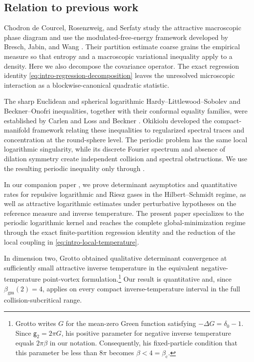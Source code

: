 \documentclass[11pt,reqno]{amsart}
\numberwithin{equation}{section}
\theoremstyle{plain}
\theoremstyle{definition}
\newcommand{\be}{\beta}
\newcommand{\g}{\mathsf g}
\newcommand{\gm}{\mathrm{gm}}
\newcommand{\coll}{\mathrm{c}}
\begin{document}
\subsection{Relation to previous work}
\label{subsec:related-work}

Chodron de Courcel, Rosenzweig, and Serfaty \cite{ChodrondeCourcelRosenzweigSerfaty2025} study the attractive macroscopic phase diagram and use the modulated-free-energy framework developed by Bresch, Jabin, and Wang \cite{BreschJabinWang2023}. Their partition estimate coarse grains the empirical measure so that entropy and a macroscopic variational inequality apply to a density. Here we also decompose the covariance operator. The exact regression identity \eqref{eq:intro-regression-decomposition} leaves the unresolved microscopic interaction as a blockwise-canonical quadratic statistic.

The sharp Euclidean and spherical logarithmic Hardy--Littlewood--Sobolev and Beckner--Onofri inequalities, together with their conformal equality families, were established by Carlen and Loss \cite{CarlenLoss1992} and Beckner \cite{Beckner1993}.  Okikiolu \cite{Okikiolu2008} developed the compact-manifold framework relating these inequalities to regularized spectral traces and concentration at the round-sphere level.  The periodic problem has the same local logarithmic singularity, while its discrete Fourier spectrum and absence of dilation symmetry create independent collision and spectral obstructions.  We use the resulting periodic inequality only through .

In our companion paper \cite{DelgadinoGvalaniRosenzweig2026}, we prove determinant asymptotics and quantitative rates for repulsive logarithmic and Riesz gases in the Hilbert--Schmidt regime, as well as attractive logarithmic estimates under perturbative hypotheses on the reference measure and inverse temperature.  The present paper specializes to the periodic logarithmic kernel and reaches the complete global-minimization regime through the exact finite-partition regression identity and the reduction of the local coupling in \eqref{eq:intro-local-temperature}.

In dimension two, Grotto \cite{Grotto2026} obtained qualitative determinant convergence at sufficiently small attractive inverse temperature in the equivalent negative-temperature point-vortex formulation.\footnote{Grotto writes $G$ for the mean-zero Green function satisfying $-\Delta G=\delta_0-1$.  Since $\g_2=2\pi G$, his positive parameter for negative inverse temperature equals $2\pi\be$ in our notation.  Consequently, his fixed-particle condition that this parameter be less than $8\pi$ becomes $\be<4=\beta_{\coll}$.}  Our result is quantitative and, since $\beta_{\gm}(2)=4$, applies on every compact inverse-temperature interval in the full collision-subcritical range.
\end{document}
